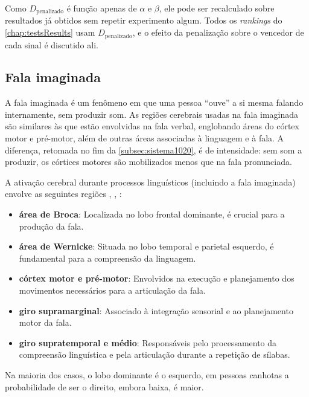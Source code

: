 				\par Como $D_{\text{penalizado}}$ é função apenas de $\alpha$ e $\beta$, ele pode ser recalculado sobre resultados já obtidos sem repetir experimento algum. Todos os \textit{rankings} do \autoref{chap:testsResults} usam $D_{\text{penalizado}}$, e o efeito da penalização sobre o vencedor de cada sinal é discutido ali.

		\subsection{Fala imaginada}
			\par A fala imaginada é um fenômeno em que uma pessoa ``ouve'' a si mesma falando internamente, sem produzir som. As regiões cerebrais usadas na fala imaginada são similares às que estão envolvidas na fala verbal, englobando áreas do córtex motor e pré-motor, além de outras áreas associadas à linguagem e à fala. A diferença, retomada no fim da \autoref{subsec:sistema1020}, é de intensidade: sem som a produzir, os córtices motores são mobilizados menos que na fala pronunciada.
			
			\par A ativação cerebral durante processos linguísticos (incluindo a fala imaginada) envolve as seguintes regiões \cite{pinto2012manual}, \cite{Vanderah2020}, \cite{kenhub}:
			
			\begin{itemize}
				\item \textbf{área de Broca}: Localizada no lobo frontal dominante, é crucial para a produção da fala.
				\item \textbf{área de Wernicke}: Situada no lobo temporal e parietal esquerdo, é fundamental para a compreensão da linguagem.
				\item \textbf{córtex motor e pré-motor}: Envolvidos na execução e planejamento dos movimentos necessários para a articulação da fala.
				\item \textbf{giro supramarginal}: Associado à integração sensorial e ao planejamento motor da fala.
				\item \textbf{giro supratemporal e médio}: Responsáveis pelo processamento da compreensão linguística e pela articulação durante a repetição de sílabas.
			\end{itemize}
			
			\par Na maioria dos casos, o lobo dominante é o esquerdo, em pessoas canhotas a probabilidade de ser o direito, embora baixa, é maior.

